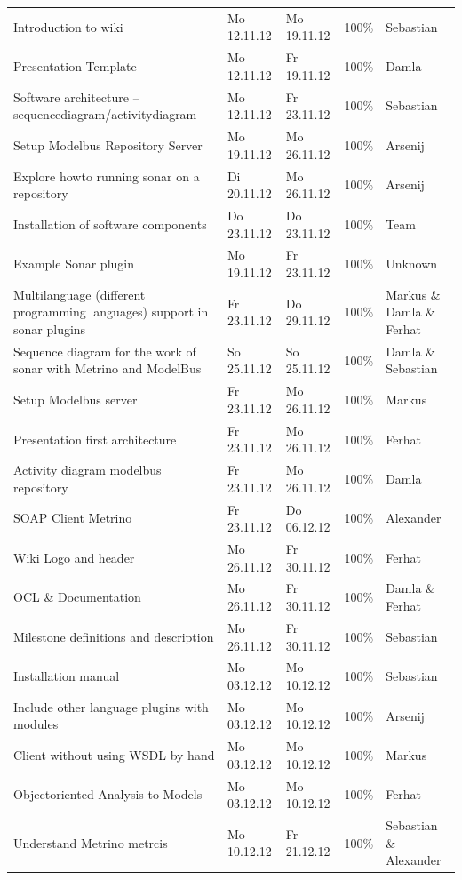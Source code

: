 \begin{longtable}{|p{6cm}|p{2.5cm}|p{2.5cm}|p{1.7cm}|p{1.8cm}|}
Introduction to wiki & Mo 12.11.12 & Mo 19.11.12 & 100\% & Sebastian \\ 
Presentation Template & Mo 12.11.12 & Fr 19.11.12 & 100\% & Damla \\ 
Software architecture – sequencediagram/activitydiagram & Mo 12.11.12 & Fr 23.11.12 & 100\% & Sebastian \\ 
Setup Modelbus Repository Server & Mo 19.11.12 & Mo 26.11.12 & 100\% & Arsenij \\ 
Explore howto running sonar on a repository & Di 20.11.12 & Mo 26.11.12 & 100\% & Arsenij \\ 
Installation of software components & Do 23.11.12 & Do 23.11.12 & 100\% & Team \\ 
Example Sonar plugin & Mo 19.11.12 & Fr 23.11.12 & 100\%     & Unknown                 \\ 
Multilanguage (different programming languages) support in sonar plugins & Fr 23.11.12 & Do 29.11.12 & 100\%     & Markus  \&  Damla  \&  Ferhat \\
Sequence diagram for the work of sonar with Metrino and ModelBus & So 25.11.12 & So 25.11.12 & 100\%     & Damla \& Sebastian \\ 
Setup Modelbus server & Fr 23.11.12 & Mo 26.11.12 & 100\%& Markus \\ 
Presentation first architecture & Fr 23.11.12 & Mo 26.11.12 & 100\% & Ferhat \\ 
Activity diagram modelbus repository & Fr 23.11.12 & Mo 26.11.12 & 100\% & Damla \\ 
SOAP Client Metrino & Fr 23.11.12 & Do 06.12.12 & 100\% & Alexander \\ 
Wiki Logo and header & Mo 26.11.12 & Fr 30.11.12 & 100\% & Ferhat \\ 
OCL  \&  Documentation & Mo 26.11.12 & Fr 30.11.12 & 100\% & Damla \&  Ferhat \\ 
Milestone definitions and description & Mo 26.11.12 & Fr 30.11.12 & 100\% & Sebastian \\ 
Installation manual & Mo 03.12.12 & Mo 10.12.12 & 100\% & Sebastian \\ 
Include other language plugins with modules & Mo 03.12.12 & Mo 10.12.12 & 100\% & Arsenij \\
Client without using WSDL by hand & Mo 03.12.12 & Mo 10.12.12 & 100\% & Markus \\ 
Objectoriented Analysis to Models & Mo 03.12.12 & Mo 10.12.12 & 100\% & Ferhat \\ 
Understand Metrino metrcis & Mo 10.12.12 & Fr 21.12.12 & 100\% & Sebastian  \&  Alexander \\ 

\end{longtable}
